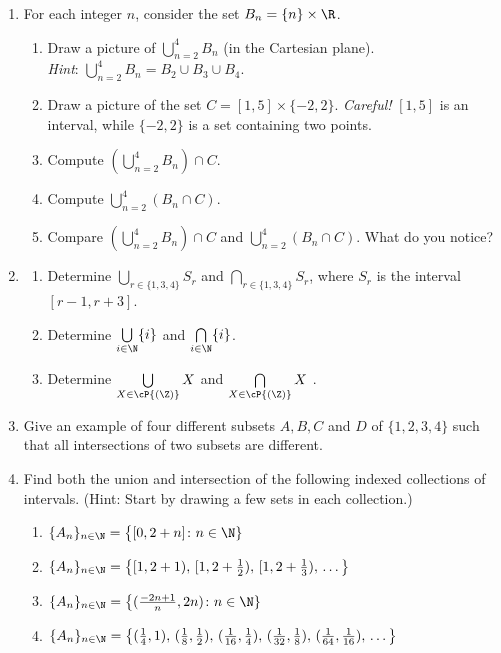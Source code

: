 \begin{enumerate}\renewcommand{\labelenumi}{\thesubsection.\theenumi}
  	\item For each integer $n$, consider the set $B_n=\{n\}\times\R$.
	\begin{enumerate}
		\item Draw a picture of $\bigcup\limits_{n=2}^4B_n$ (in the Cartesian plane).\\
		\emph{Hint}:  $\bigcup \limits_{n=2}^{4} B_n= B_2 \cup B_3 \cup B_4.$
		\item Draw a picture of the set $C=[1,5]\times\{-2,2\}.$
		\emph{Careful!} $[1,5]$ is an interval, while $\{-2,2\}$ is a set containing two points.
		\item Compute $\left(\bigcup\limits_{n=2}^4B_n\right)\cap C$.
		\item Compute $\bigcup\limits_{n=2}^4\left(B_n\cap C\right)$.
		\item Compare $\left(\bigcup\limits_{n=2}^4B_n\right)\cap C$ and $\bigcup\limits_{n=2}^4\left(B_n\cap C\right)$. What do you notice?
	\end{enumerate}

  \item \begin{enumerate} \item Determine $\bigcup\limits_{r\in \{1,3,4\}}S_r$ and $\bigcap\limits_{r\in \{1,3,4\}}S_r$, where $S_r$ is the interval $[r-1,r+3]$.
  \item Determine $\bigcup\limits_{i\in \N} \{i\}$ and $\bigcap\limits_{i\in \N} \{i\}$.

\item Determine $\bigcup\limits_{X\in \cP{(\Z)}} X$ and $\bigcap\limits_{X\in \cP{(\Z)}} X$ .
\end{enumerate}

  \item Give an example of four different subsets $A,B,C$ and $D$ of $\{1,2,3,4\}$ such that all intersections of two subsets are different.

  \item Find both the union and intersection of the following indexed collections of intervals. (Hint: Start by drawing a few sets in each collection.)
   \begin{enumerate}
     \item $\{A_n\}_{n\in\N} = \big\{[0,2+n] \colon  n \in \N\}$
     \item $\{A_n\}_{n\in\N} = \big\{[1,2+1),\,[1,2+\frac 12),\,[1,2+\frac 13),\,\ldots\big\}$
     \item $\{A_n\}_{n\in\N} =  \big\{(\frac{-2n+1}{n},2n)  \colon  n \in \N\} $
     \item $\{A_n\}_{n\in\N} = \big\{(\frac 14,1),\,(\frac 18,\frac 12),\,(\frac 1{16},\frac 14),\,(\frac 1{32},\frac 18), \,(\frac 1{64},\frac 1{16}),\,\ldots\big\}$
   \end{enumerate}
  

\end{enumerate}
